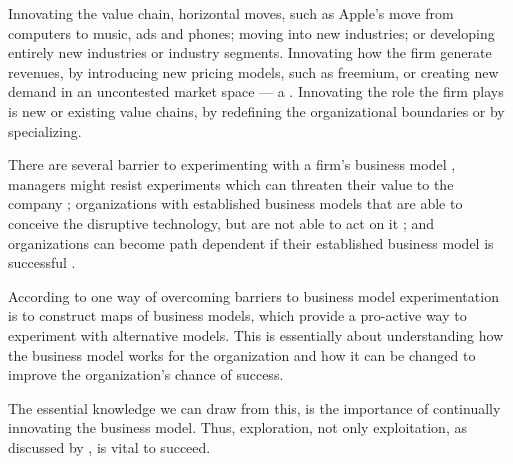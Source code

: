\begin{enum}
   Innovating the value chain, \eg horizontal moves, such as Apple's move from computers to music, ads and phones; moving into new industries; or developing entirely new industries or industry segments.
   Innovating how the firm generate revenues, \eg by introducing new pricing models, such as freemium, or creating new demand in an uncontested market space --- a  \citep{kim2004}.
   Innovating the role the firm plays is new or existing value chains, \eg by redefining the organizational boundaries or by specializing.
\end{enum}

There are several barrier to experimenting with a firm's business model \citep{chesbrough2010}, \eg managers might resist experiments which can threaten their value to the company \citep{amit2001}; organizations with established business models that are able to conceive the disruptive technology, but are not able to act on it \citep{bower1995,christensen1997,christensen2003}; and organizations can become path dependent if their established business model is successful \citep{chesbrough2010,tushman1986}.

According to \citet{chesbrough2010} one way of overcoming barriers to business model experimentation is to construct maps of business models, which provide a pro-active way to experiment with alternative models. This is essentially about understanding how the business model works for the organization and how it can be changed to improve the organization's chance of success.


The essential knowledge we can draw from this, is the importance of continually innovating the business model. Thus, exploration, not only exploitation, as discussed by \citet{march1991}, is vital to succeed.

